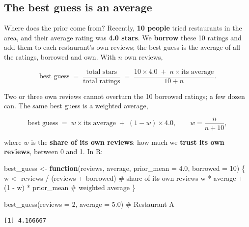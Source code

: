 \documentclass[
  letterpaper,
  DIV=11,
  numbers=noendperiod]{scrartcl}
\newenvironment{Shaded}{\begin{snugshade}}{\end{snugshade}}
\newcommand{\AttributeTok}[1]{\textcolor[rgb]{0.40,0.45,0.13}{#1}}
\newcommand{\CommentTok}[1]{\textcolor[rgb]{0.37,0.37,0.37}{#1}}
\newcommand{\ControlFlowTok}[1]{\textcolor[rgb]{0.00,0.23,0.31}{\textbf{#1}}}
\newcommand{\DecValTok}[1]{\textcolor[rgb]{0.68,0.00,0.00}{#1}}
\newcommand{\FloatTok}[1]{\textcolor[rgb]{0.68,0.00,0.00}{#1}}
\newcommand{\FunctionTok}[1]{\textcolor[rgb]{0.28,0.35,0.67}{#1}}
\newcommand{\NormalTok}[1]{\textcolor[rgb]{0.00,0.23,0.31}{#1}}
\newcommand{\OtherTok}[1]{\textcolor[rgb]{0.00,0.23,0.31}{#1}}
\newcommand{\SpecialCharTok}[1]{\textcolor[rgb]{0.37,0.37,0.37}{#1}}
\begin{document}
\subsection{The best guess is an
average}\label{the-best-guess-is-an-average}

Where does the prior come from? Recently, \textbf{10 people} tried
restaurants in the area, and their average rating was \textbf{4.0
stars}. We \textbf{borrow} these 10 ratings and add them to each
restaurant's own reviews; the best guess is the average of all the
ratings, borrowed and own. With \(n\) own reviews,

\[
\text{best guess} \;=\; \frac{\text{total stars}}{\text{total ratings}}
\;=\; \frac{10 \times 4.0 \;+\; n \times \text{its average}}{10 + n}.
\]

Two or three own reviews cannot overturn the 10 borrowed ratings; a few
dozen can. The same best guess is a weighted average,

\[
\text{best guess} \;=\; w \times \text{its average} \;+\; (1 - w) \times 4.0,
\qquad w = \frac{n}{n + 10},
\]

where \(w\) is the \textbf{share of its own reviews}: how much we
\textbf{trust its own reviews}, between 0 and 1. In R:

\begin{Shaded}
\begin{Highlighting}[]
\NormalTok{best\_guess }\OtherTok{\textless{}{-}} \ControlFlowTok{function}\NormalTok{(reviews, average, }\AttributeTok{prior\_mean =} \FloatTok{4.0}\NormalTok{, }\AttributeTok{borrowed =} \DecValTok{10}\NormalTok{) \{}
\NormalTok{  w }\OtherTok{\textless{}{-}}\NormalTok{ reviews }\SpecialCharTok{/}\NormalTok{ (reviews }\SpecialCharTok{+}\NormalTok{ borrowed)           }\CommentTok{\# share of its own reviews}
\NormalTok{  w }\SpecialCharTok{*}\NormalTok{ average }\SpecialCharTok{+}\NormalTok{ (}\DecValTok{1} \SpecialCharTok{{-}}\NormalTok{ w) }\SpecialCharTok{*}\NormalTok{ prior\_mean            }\CommentTok{\# weighted average}
\NormalTok{\}}

\FunctionTok{best\_guess}\NormalTok{(}\AttributeTok{reviews =} \DecValTok{2}\NormalTok{,   }\AttributeTok{average =} \FloatTok{5.0}\NormalTok{)        }\CommentTok{\# Restaurant A}
\end{Highlighting}
\end{Shaded}

\begin{verbatim}
[1] 4.166667
\end{verbatim}
\end{document}
